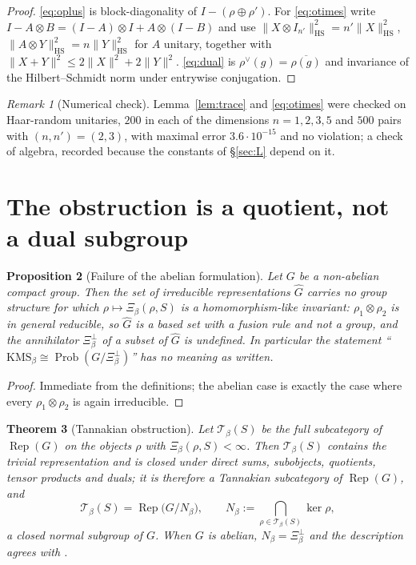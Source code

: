 \documentclass[11pt]{amsart}
\numberwithin{equation}{section}
\newtheorem{theorem}{Theorem}[section]
\newtheorem{proposition}[theorem]{Proposition}
\theoremstyle{definition}
\theoremstyle{remark}
\newtheorem{remark}[theorem]{Remark}
\newcommand{\cT}{\mathcal{T}}
\newcommand{\Rep}{\operatorname{Rep}}
\newcommand{\HS}{\mathrm{HS}}
\newcommand{\Prob}{\operatorname{Prob}}
\begin{document}
\begin{proof}
\eqref{eq:oplus} is block-diagonality of $I-(\rho\oplus\rho')$. For \eqref{eq:otimes} write
$I-A\otimes B=(I-A)\otimes I+A\otimes(I-B)$ and use
$\|X\otimes I_{n'}\|_{\HS}^2=n'\|X\|_{\HS}^2$, $\|A\otimes Y\|_{\HS}^2=n\|Y\|_{\HS}^2$ for
$A$ unitary, together with $\|X+Y\|^2\le2\|X\|^2+2\|Y\|^2$. \eqref{eq:dual} is
$\rho^\vee(g)=\overline{\rho(g)}$ and invariance of the Hilbert--Schmidt norm under entrywise
conjugation.
\end{proof}

\begin{remark}[Numerical check]\label{rem:num1}
Lemma~\ref{lem:trace} and \eqref{eq:otimes} were checked on Haar-random unitaries, $200$ in
each of the dimensions $n=1,2,3,5$ and $500$ pairs with $(n,n')=(2,3)$, with maximal error
$3.6\cdot10^{-15}$ and no violation; a check of algebra, recorded because the constants
of \S\ref{sec:L} depend on it.
\end{remark}

\section{The obstruction is a quotient, not a dual subgroup}\label{sec:tannaka}

\begin{proposition}[Failure of the abelian formulation]\label{prop:failure}
Let $G$ be a non-abelian compact group. Then the set of irreducible representations
$\widehat G$ carries no group structure for which $\rho\mapsto\Xi_\beta(\rho,S)$ is a
homomorphism-like invariant: $\rho_1\otimes\rho_2$ is in general reducible, so
$\widehat G$ is a based set with a fusion rule and not a group, and the annihilator
$\Xi_\beta^\perp$ of a subset of $\widehat G$ is undefined. In particular the statement
``$\mathrm{KMS}_\beta\cong\Prob(G/\Xi_\beta^\perp)$'' has no meaning as written.
\end{proposition}

\begin{proof}
Immediate from the definitions; the abelian case is exactly the case where every
$\rho_1\otimes\rho_2$ is again irreducible.
\end{proof}

\begin{theorem}[Tannakian obstruction]\label{thm:tannaka}
Let $\cT_\beta(S)$ be the full subcategory of $\Rep(G)$ on the objects $\rho$ with
$\Xi_\beta(\rho,S)<\infty$. Then $\cT_\beta(S)$ contains the trivial representation and is
closed under direct sums, subobjects, quotients, tensor products and duals; it is therefore a
Tannakian subcategory of $\Rep(G)$, and
\[
\cT_\beta(S)=\Rep\bigl(G/N_\beta\bigr),
\qquad
N_\beta:=\bigcap_{\rho\in\cT_\beta(S)}\ker\rho ,
\]
a closed normal subgroup of $G$. When $G$ is abelian, $N_\beta=\Xi_\beta^\perp$ and the
description agrees with \cite[Thm.~3.6]{Main}.
\end{theorem}
\end{document}
